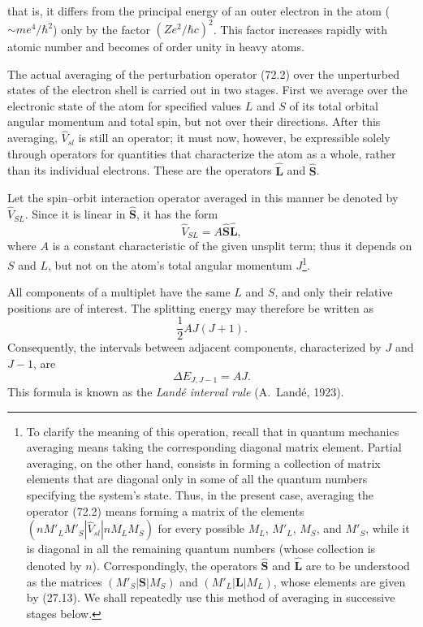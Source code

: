 that is, it differs from the principal energy of an outer electron in the atom ($\sim me^4/\hbar^2$) only by the factor $(Ze^2/\hbar c)^2$. This factor increases rapidly with atomic number and becomes of order unity in heavy atoms.

The actual averaging of the perturbation operator (72.2) over the unperturbed states of the electron shell is carried out in two stages. First we average over the electronic state of the atom for specified values $L$ and $S$ of its total orbital angular momentum and total spin, but not over their directions. After this averaging, $\hat V_{sl}$ is still an operator; it must now, however, be expressible solely through operators for quantities that characterize the atom as a whole, rather than its individual electrons. These are the operators $\hat{\mathbf L}$ and $\hat{\mathbf S}$.

Let the spin--orbit interaction operator averaged in this manner be denoted by $\hat V_{SL}$. Since it is linear in $\hat{\mathbf S}$, it has the form
\begin{equation}
 \hat V_{SL}=A\hat{\mathbf S}\hat{\mathbf L},
 \tag{72.4}
\end{equation}
where $A$ is a constant characteristic of the given unsplit term; thus it depends on $S$ and $L$, but not on the atom's total angular momentum $J$\footnote{To clarify the meaning of this operation, recall that in quantum mechanics averaging means taking the corresponding diagonal matrix element. Partial averaging, on the other hand, consists in forming a collection of matrix elements that are diagonal only in some of all the quantum numbers specifying the system's state. Thus, in the present case, averaging the operator (72.2) means forming a matrix of the elements $(nM'_LM'_S|\hat V_{sl}|nM_LM_S)$ for every possible $M_L$, $M'_L$, $M_S$, and $M'_S$, while it is diagonal in all the remaining quantum numbers (whose collection is denoted by $n$). Correspondingly, the operators $\hat{\mathbf S}$ and $\hat{\mathbf L}$ are to be understood as the matrices $(M'_S|\mathbf S|M_S)$ and $(M'_L|\mathbf L|M_L)$, whose elements are given by (27.13). We shall repeatedly use this method of averaging in successive stages below.}.



All components of a multiplet have the same $L$ and $S$, and only their relative positions are of interest. The splitting energy may therefore be written as
\begin{equation}
 \frac12AJ(J+1).
 \tag{72.5}
\end{equation}
Consequently, the intervals between adjacent components, characterized by $J$ and $J-1$, are
\begin{equation}
 \Delta E_{J,J-1}=AJ.
 \tag{72.6}
\end{equation}
This formula is known as the \emph{Land\'e interval rule} (A.~Land\'e, 1923).

